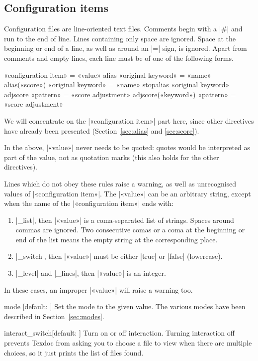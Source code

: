 \documentclass[draft]{texdoc-doc}
\begin{document}
\subsection{Configuration items}
\label{sec:conf}

Configuration files are line-oriented text files. Comments begin with a |#|
and run to the end of line. Lines containing only space are ignored. Space at
the beginning or end of a line, as well as around an |=| sign, is ignored.
Apart from comments and empty lines, each line must be of one of the following
forms.
%
\begin{htcode}
«configuration item» = «value»
alias «original keyword» = «name»
alias(«score») «original keyword» = «name»
stopalias «original keyword»
adjscore «pattern» = «score adjustment»
adjscore(«keyword») «pattern» = «score adjustment»
\end{htcode}

We will concentrate on the |«configuration item»| part here, since other
directives have already been presented (Section~\ref{sec:alias} and
\ref{sec:score}).

In the above, |«value»|  never needs to be quoted: quotes would be interpreted
as part of the value, not as quotation marks (this also holds for the other
directives).

Lines which do not obey these rules raise a warning, as well as unrecognised
values of |«configuration item»|. The |«value»| can be an arbitrary string,
except when the name of the |«configuration item»| ends with:
%
\begin{enumerate}
\item |_list|, then |«value»| is a coma-separated list of strings. Spaces
  around commas are ignored. Two consecutive comas or a coma at the beginning
  or end of the list means the empty string at the corresponding place.
\item |_switch|, then |«value»| must be either |true| or |false|
  (lowercase).
\item |_level| and |_lines|, then |«value»| is an integer.
\end{enumerate}
%
In these cases, an improper |«value»| will raise a warning too.

\begin{confitem}{mode}
  {}[default: ]
Set the  mode to the given value. The various modes have been described
in Section~\ref{sec:modes}.
\end{confitem}

\begin{confitem}{interact\_switch}{}[default: ]
Turn on or off interaction. Turning interaction off prevents Texdoc from asking
you to choose a file to view when there are multiple choices, so it just prints
the list of files found.
\end{confitem}
\end{document}
